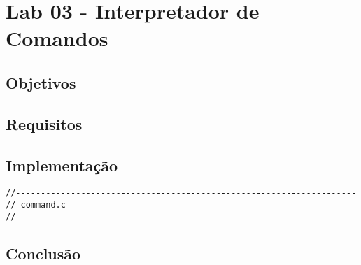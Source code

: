 \chapter{Lab 03 - Interpretador de Comandos}

\section{Objetivos}

\section{Requisitos}

\section{Implementação}

\newpage
\begin{espacosimples}
\begin{verbatim}
//--------------------------------------------------------------------
// command.c
//--------------------------------------------------------------------
\end{verbatim}
\end{espacosimples}

\section{Conclusão}